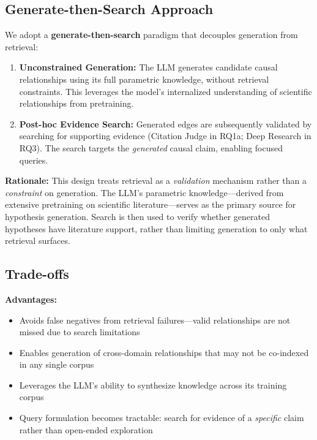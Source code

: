 \subsection{Generate-then-Search Approach}

We adopt a \textbf{generate-then-search} paradigm that decouples generation from retrieval:

\begin{enumerate}[noitemsep]
    \item \textbf{Unconstrained Generation:} The LLM generates candidate causal relationships using its full parametric knowledge, without retrieval constraints. This leverages the model's internalized understanding of scientific relationships from pretraining.
    \item \textbf{Post-hoc Evidence Search:} Generated edges are subsequently validated by searching for supporting evidence (Citation Judge in RQ1a; Deep Research in RQ3). The search targets the \textit{generated} causal claim, enabling focused queries.
\end{enumerate}

\textbf{Rationale:} This design treats retrieval as a \textit{validation} mechanism rather than a \textit{constraint} on generation. The LLM's parametric knowledge---derived from extensive pretraining on scientific literature---serves as the primary source for hypothesis generation. Search is then used to verify whether generated hypotheses have literature support, rather than limiting generation to only what retrieval surfaces.

\subsection{Trade-offs}

\textbf{Advantages:}
\begin{itemize}[noitemsep]
    \item Avoids false negatives from retrieval failures---valid relationships are not missed due to search limitations
    \item Enables generation of cross-domain relationships that may not be co-indexed in any single corpus
    \item Leverages the LLM's ability to synthesize knowledge across its training corpus
    \item Query formulation becomes tractable: search for evidence of a \textit{specific} claim rather than open-ended exploration
\end{itemize}

